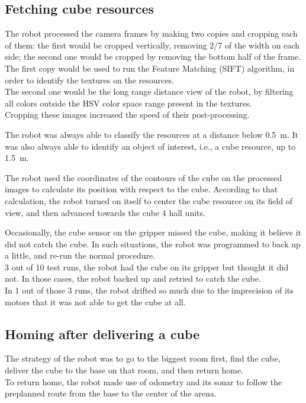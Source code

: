 \subsection{Fetching cube resources}

The robot processed the camera frames by making two copies and cropping each of them: the first would be cropped vertically, removing 2/7 of the width on each side; the second one would be cropped by removing the bottom half of the frame.\\
The first copy would be used to run the Feature Matching (SIFT) algorithm, in order to identify the textures on the resources.\\
The second one would be the long range distance view of the robot, by filtering all colors outside the HSV color space range present in the textures.\\
Cropping these images increased the speed of their post-processing.

The robot was always able to classify the resources at a distance below \SI{0.5}{\m}. It was also always able to identify an object of interest, i.e., a cube resource, up to \SI{1.5}{\m}.

The robot used the coordinates of the contours of the cube on the processed images to calculate its position with respect to the cube. According to that calculation, the robot turned on itself to center the cube resource on its field of view, and then advanced towards the cube 4 hall units.

Occasionally, the cube sensor on the gripper missed the cube, making it believe it did not catch the cube. In such situations, the robot was programmed to back up a little, and re-run the normal procedure.\\
3 out of 10 test runs, the robot had the cube on its gripper but thought it did not. In those cases, the robot backed up and retried to catch the cube.\\
In 1 out of those 3 runs, the robot drifted so much due to the imprecision of its motors that it was not able to get the cube at all.


\subsection{Homing after delivering a cube}

The strategy of the robot was to go to the biggest room first, find the cube, deliver the cube to the base on that room, and then return home.\\
To return home, the robot made use of odometry and its sonar to follow the preplanned route from the base to the center of the arena.

